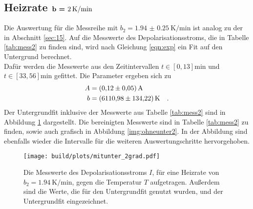 \subsection{Heizrate $\textbf{b = \SI{2}{\kelvin\per\minute}}$}

\noindent
Die Auswertung für die Messreihe mit $b_2 = \SI{1.94(025)}{\kelvin\per\minute}$ ist analog zu der in Abschnitt \ref{sec:15}. 
Auf die Messwerte des Depolarisationsstroms, die in Tabelle \ref{tab:mess2} zu finden sind, wird nach Gleichung \ref{eqn:exp} ein Fit auf den Untergrund berechnet.\\
Dafür werden die Messwerte aus den Zeitintervallen $t \in [0,13]\si{\minute}$ und $t \in [33,56]\si{\minute}$ gefittet.
Die Parameter ergeben sich zu 
\begin{align*}
  A &= \SI{ 0.12  (005)}{\ampere}\\
  b &= \SI{ 6110.98 (13422)}{\kelvin} \quad .
\end{align*}
Der Untergrundfit inklusive der Messwerte aus Tabelle \ref{tab:mess2} sind in Abbildung \ref{img:mitunter2} dargestellt.
Die bereinigten Messwerte sind in Tabelle \ref{tab:mess2} zu finden, sowie auch grafisch in Abbildung \ref{img:ohneunter2}.
In der Abbildung sind ebenfalls wieder die Intervalle für die weiteren Auswertungschritte hervorgehoben.
\begin{figure}[h]
  \centering
  \texttt{[image: build/plots/mitunter\_2grad.pdf]}
  \caption{Die Messwerte des Depolarisationsstroms $I$, für eine Heizrate von $b_2 = \SI{1.94}{\kelvin\per\minute}$, gegen die Temperatur $T$ aufgetragen. 
  Außerdem sind die Werte, die für den Untergrundfit genutzt wurden, und der Untergrundfit eingezeichnet.}
  \label{img:mitunter2}
\end{figure}



